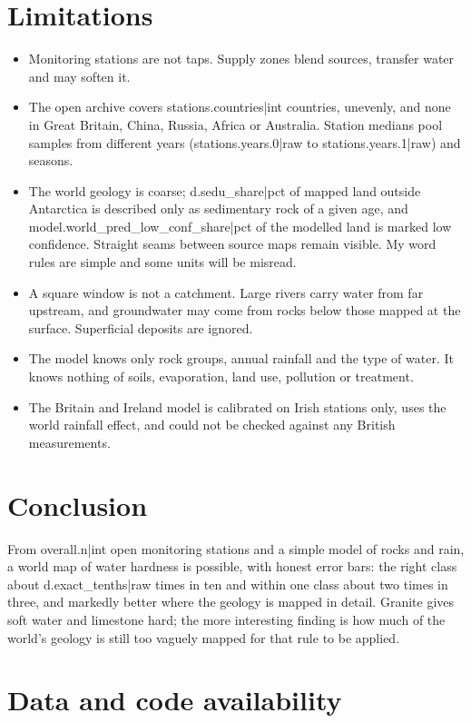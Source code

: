 \documentclass[11pt,a4paper]{article}
\begin{document}
\section{Limitations}

\begin{itemize}
\item Monitoring stations are not taps. Supply zones blend sources, transfer water and may soften it.
\item The open archive covers {{stations.countries|int}} countries, unevenly, and none in Great Britain, China, Russia, Africa or Australia. Station medians pool samples from different years ({{stations.years.0|raw}} to {{stations.years.1|raw}}) and seasons.
\item The world geology is coarse; {{d.sedu_share|pct}} of mapped land outside Antarctica is described only as sedimentary rock of a given age, and {{model.world_pred_low_conf_share|pct}} of the modelled land is marked low confidence. Straight seams between source maps remain visible. My word rules are simple and some units will be misread.
\item A square window is not a catchment. Large rivers carry water from far upstream, and groundwater may come from rocks below those mapped at the surface. Superficial deposits are ignored.
\item The model knows only rock groups, annual rainfall and the type of water. It knows nothing of soils, evaporation, land use, pollution or treatment.
\item The Britain and Ireland model is calibrated on Irish stations only, uses the world rainfall effect, and could not be checked against any British measurements.
\end{itemize}

\section{Conclusion}

From {{overall.n|int}} open monitoring stations and a simple model of rocks and rain, a world map of water hardness is possible, with honest error bars: the right class about {{d.exact_tenths|raw}} times in ten and within one class about two times in three, and markedly better where the geology is mapped in detail. Granite gives soft water and limestone hard; the more interesting finding is how much of the world's geology is still too vaguely mapped for that rule to be applied.

\section*{Data and code availability}
\end{document}
